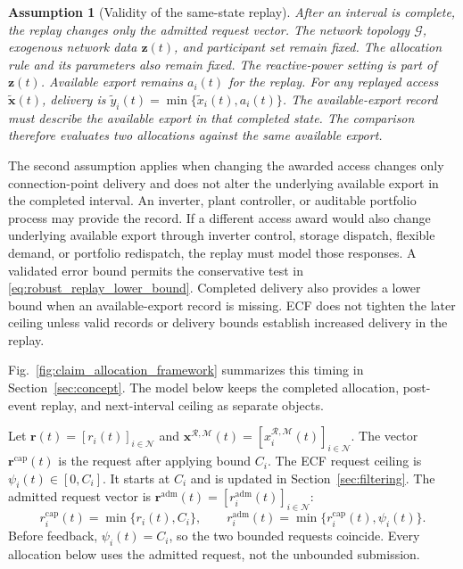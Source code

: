 \documentclass[twoside,twocolumn,9pt]{article}
\newtheorem{assumption}{Assumption}
\begin{document}
{\begin{assumption}[Validity of the same-state replay]
\label{ass:counterfactual_consistency}
After an interval is complete, the replay changes only the admitted request
vector. The network topology $\mathcal G$, exogenous network data $\mathbf z(t)$,
and participant set remain fixed. The allocation rule and its parameters also
remain fixed. The reactive-power setting is part of $\mathbf z(t)$. Available
export remains $a_i(t)$ for the replay. For any replayed access
$\widetilde{\mathbf x}(t)$, delivery is
$\widetilde y_i(t)=\min\{\widetilde x_i(t),a_i(t)\}$. The available-export record must describe
the available export in that completed state. The comparison therefore evaluates two allocations against the same available
export.
\end{assumption}

The second assumption applies when changing the awarded access changes only
connection-point delivery and does not alter the underlying available export in
the completed interval. An inverter, plant controller, or auditable portfolio
process may provide the record. If a different access award would also change
underlying available export through inverter control, storage dispatch,
flexible demand, or portfolio redispatch, the replay must model those responses.
A validated error bound permits the conservative test in
\eqref{eq:robust_replay_lower_bound}. Completed delivery also provides a lower
bound when an available-export record is missing. ECF does not tighten the
later ceiling unless valid records or delivery bounds establish increased
delivery in the replay.

Fig.~\ref{fig:claim_allocation_framework} summarizes this timing in
Section~\ref{sec:concept}. The model below keeps the completed allocation,
post-event replay, and next-interval ceiling as separate objects.

Let $\mathbf r(t)=[r_i(t)]_{i\in\mathcal N}$ and
$\mathbf x^{\mathcal R,\mathcal M}(t)=
[x_i^{\mathcal R,\mathcal M}(t)]_{i\in\mathcal N}$. The vector
$\mathbf r^{\mathrm{cap}}(t)$ is the request after applying bound $C_i$. The
ECF request ceiling is $\psi_i(t)\in[0,C_i]$. It starts at $C_i$ and is
updated in Section~\ref{sec:filtering}. The admitted request vector is
$\mathbf r^{\mathrm{adm}}(t)=[r_i^{\mathrm{adm}}(t)]_{i\in\mathcal N}$:
\begin{equation}
r_i^{\mathrm{cap}}(t)=\min\{r_i(t),C_i\},\qquad
r_i^{\mathrm{adm}}(t)=\min\{r_i^{\mathrm{cap}}(t),\psi_i(t)\}.
\label{eq:request_layers}
\end{equation}
Before feedback, $\psi_i(t)=C_i$, so the two bounded requests coincide. Every
allocation below uses the admitted request, not the unbounded submission.

}
\end{document}
